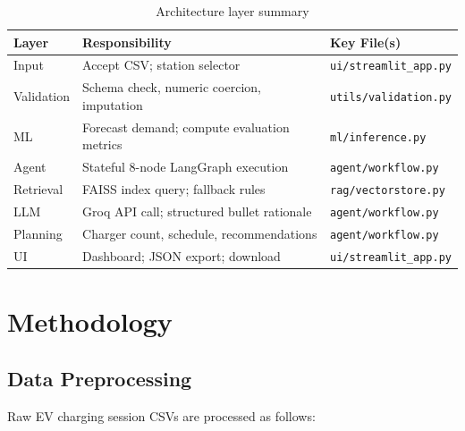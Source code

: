 \documentclass[12pt,a4paper]{article}
\begin{document}
\begin{table}[H]
\centering
\caption{Architecture layer summary}
\begin{tabularx}{\linewidth}{lXl}
  \toprule
  \textbf{Layer} & \textbf{Responsibility} & \textbf{Key File(s)} \\
  \midrule
  Input       & Accept CSV; station selector                   & \texttt{ui/streamlit\_app.py} \\
  Validation  & Schema check, numeric coercion, imputation     & \texttt{utils/validation.py} \\
  ML          & Forecast demand; compute evaluation metrics    & \texttt{ml/inference.py} \\
  Agent       & Stateful 8-node LangGraph execution            & \texttt{agent/workflow.py} \\
  Retrieval   & FAISS index query; fallback rules              & \texttt{rag/vectorstore.py} \\
  LLM         & Groq API call; structured bullet rationale     & \texttt{agent/workflow.py} \\
  Planning    & Charger count, schedule, recommendations       & \texttt{agent/workflow.py} \\
  UI          & Dashboard; JSON export; download               & \texttt{ui/streamlit\_app.py} \\
  \bottomrule
\end{tabularx}
\label{tab:layers}
\end{table}

\section{Methodology}
\label{sec:methodology}

\subsection{Data Preprocessing}
\label{subsec:data}

Raw EV charging session CSVs are processed as follows:
\end{document}
